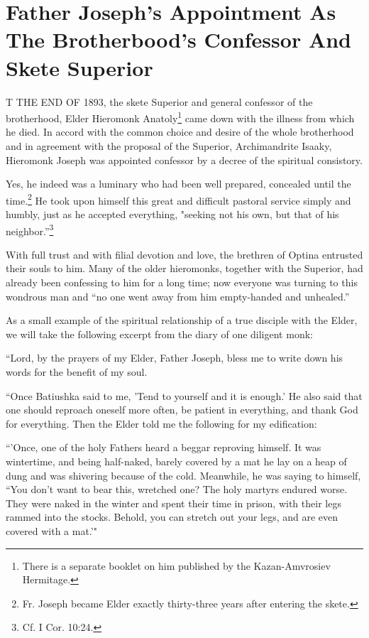 \chapter{Father Joseph's Appointment As The Brotherbood's Confessor And Skete Superior}

T THE END OF 1893, the skete Superior and general confessor of the brotherhood, Elder Hieromonk Anatoly\footnote{There is a separate booklet on him published by the Kazan-Amvrosiev Hermitage.} came down with the illness from which he died. In accord with the common choice and desire of the whole brotherhood and in agreement with the proposal of the Superior, Archimandrite Isaaky, Hieromonk Joseph was appointed confessor by a decree of the spiritual consistory.

Yes, he indeed was a luminary who had been well prepared, concealed until the time.\footnote{Fr. Joseph became Elder exactly thirty-three years after entering the skete.} He took upon himself this great and difficult pastoral service simply and humbly, just as he accepted everything, "seeking not his own, but that of his neighbor.”\footnote{Cf. I Cor. 10:24.}

With full trust and with filial devotion and love, the brethren of Optina entrusted their souls to him. Many of the older hieromonks, together with the Superior, had already been confessing to him for a long time; now everyone was turning to this wondrous man and “no one went away from him empty-handed and unhealed.”

As a small example of the spiritual relationship of a true disciple with the Elder, we will take the following excerpt from the diary of one diligent monk:

“Lord, by the prayers of my Elder, Father Joseph, bless me to write down his words for the benefit of my soul.

“Once Batiushka said to me, 'Tend to yourself and it is enough.' He also said that one should reproach oneself more often, be patient in everything, and thank God for everything. Then the Elder told me the following for my edification:

“'Once, one of the holy Fathers heard a beggar reproving himself. It was wintertime, and being half-naked, barely covered by a mat he lay on a heap of dung and was shivering because of the cold. Meanwhile, he was saying to himself, “You don't want to bear this, wretched one? The holy martyrs endured worse. They were naked in the winter and spent their time in prison, with their legs rammed into the stocks. Behold, you can stretch out your legs, and are even covered with a mat.'"

